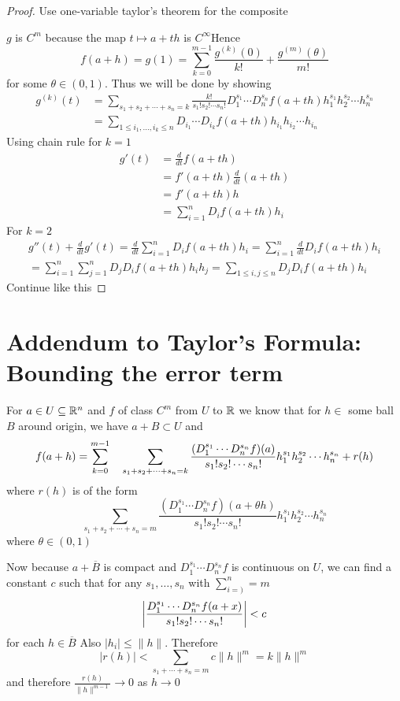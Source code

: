 \begin{proof}
	Use one-variable taylor's theorem for the composite 
	
	\begin{center}
	\end{center}$g$ is $C^m$ because the map $t\mapsto a+th$ is $C^{\infty}$Hence $$f(a+h)=g(1)=\sum_{k=0}^{m-1}\frac{g^{(k)}(0)}{k!}+\frac{g^{(m)}(\theta)}{m!}$$for some $\theta\in (0,1)$. Thus we will be done by showing \begin{align*}
	g^{(k)}(t) &=\sum_{s_1+s_2+\cdots+s_n=k} \frac{k!}{s_1!s_2!\cdots s_n!}D_1^{s_1}\cdots D_n^{s_n}f(a+th)h_1^{s_1}h_2^{s_2}\cdots h_n^{s_n}\\
	&=\sum_{1\leq i_1,\dots,i_k\leq n}D_{i_1}\cdots D_{i_k}f(a+th)h_{i_1}h_{i_2}\cdots h_{i_n}
\end{align*}
Using chain rule for $k=1$ \begin{align*}
	g'(t) & =\frac{d}{dt}f(a+th)\\
	 &= f'(a+th)\frac{d}{dt}(a+th)\\
	 &=f'(a+th)h\\
	 &=\sum_{i=1}^nD_if(a+th)h_i
\end{align*}For $k=2$ \begin{multline*}
g''(t)+\frac{d}{dt}g'(t)=\frac{d}{dt}\sum_{i=1}^nD_if(a+th)h_i=\sum_{i=1}^n\frac{d}{dt}D_if(a+th)h_i\\
=\sum_{i=1}^n\sum_{j=1}^nD_jD_if(a+th)h_ih_j=\sum_{1\leq i,j\leq n}D_jD_if(a+th)h_i
\end{multline*}Continue like this
\end{proof}
\section*{Addendum to Taylor's Formula: Bounding the error term}
For $a\in U\subseteq \mathbb{R}^n$ and $f$ of class $C^m$ from $U$ to $\mathbb{R}$ we know that  for $h\in $ some ball $B$ around origin, we have $a+B\subset U$ and $$f(a+h)=\sum_{k=0}^{m-1}\quad \sum_{s_1+s_2+\cdots+s_n=k} \frac{(D_1^{s_1}\cdots D_n^{s_n}f)(a)}{s_1!s_2!\cdots s_n!}h_1^{s_1}h_2^{s_2}\cdots h_n^{s_n}+\EqM{r}{r(h)}$$where $r(h)$ is of the form $$\sum_{s_1+s_2+\cdots+s_n=m} \frac{(D_1^{s_1}\cdots D_n^{s_n}f)(a+\theta h)}{s_1!s_2!\cdots s_n!}h_1^{s_1}h_2^{s_2}\cdots h_n^{s_n}$$ where $\theta\in (0,1)$

Now because $a+\overline{B}$ is compact and $D_1^{s_1}\cdots D_n^{s_n}f$ is continuous  on $U$, we can find a constant $c$ such that for any $s_1,\dots,s_n$ with $\sum\limits_{i=)}^n =m$ $$\left| \frac{D_1^{s_1}\cdots D_n^{s_n}f(a+x)}{s_1!s_2!\cdots s_n!}\right|<c$$for each $h\in \overline{B}$ Also $|h_i|\leq \|h\|$. Therefore $$|r(h)|<\sum_{s_1+\cdots+s_n=m}c\|h\|^m=k\|h\|^m$$and therefore $\frac{r(h)}{\|h\|^{m-1}}\to 0$ as $h\to 0$
